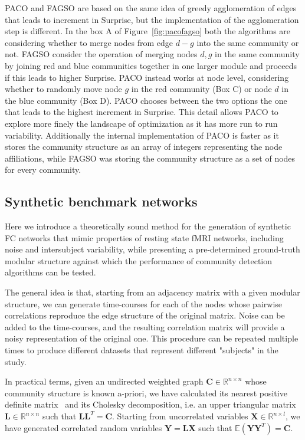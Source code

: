 PACO and FAGSO are based on the same idea of greedy agglomeration of edges that leads to increment in Surprise, but the implementation of the agglomeration step is different.
In the box A of Figure~\ref{fig:pacofagso} both the algorithms are considering whether to merge nodes from edge $d-g$ into the same community or not.
FAGSO consider the operation of merging nodes $d,g$ in the same community by joining red and blue communities together in one larger module and proceeds if this leads to higher Surprise.
PACO instead works at node level, considering whether to randomly move node $g$ in the red community (Box C) or node $d$ in the blue community (Box D). PACO chooses between the two options the one that leads to the highest increment in Surprise.
This detail allows PACO to explore more finely the landscape of optimization as it has more run to run variability. Additionally the internal implementation of PACO is faster as it stores the community structure as an array of integers representing the node affiliations, while FAGSO was storing the community structure as a set of nodes for every community.





\subsection{Synthetic benchmark networks}
Here we introduce a theoretically sound method for the generation of synthetic FC networks that mimic properties of resting state fMRI networks, including noise and intersubject variability, while presenting a pre-determined ground-truth modular structure against which the performance of community detection algorithms can be tested.

The general idea is that, starting from an adjacency matrix with a given modular structure, we can generate time-courses for each of the nodes whose pairwise correlations reproduce the edge structure of the original matrix. Noise can be added to the time-courses, and the resulting correlation matrix will provide a noisy representation of the original one. This procedure can be repeated multiple times to produce different datasets that represent different "subjects" in the study.

In practical terms, given an undirected weighted graph  $\mathbf{C} \in \mathbb{R}^{n\times n}$ whose community structure is known a-priori, we have calculated its nearest positive definite matrix~\cite{higham1988} and its Cholesky decomposition, i.e. an upper triangular matrix $\mathbf{L}\in \mathbb{R}^{n\times n}$ such that $\mathbf{L}\mathbf{L}^T=\mathbf{C}$. Starting from uncorrelated variables $\mathbf{X} \in \mathbb{R}^{n \times l}$, we have generated correlated random variables $\mathbf{Y}=\mathbf{L} \mathbf{X}$ such that $\mathbb{E}(\mathbf{Y}\mathbf{Y}^T)=\mathbf{C}$.

